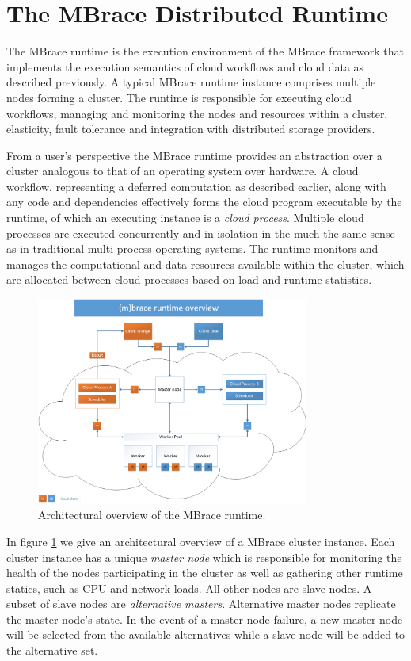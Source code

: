 \documentclass[9pt,a4paper]{article}
\newcommand{\mbrace}{MBrace}
\newcommand{\TitularMbrace}{MBrace}
\begin{document}
\section{The \TitularMbrace{} Distributed Runtime}
\label{sec:runtime}

The \mbrace{} runtime is the execution environment of the \mbrace{} framework
that implements the execution semantics of cloud workflows and cloud data
as described previously. A typical \mbrace{} runtime instance comprises
multiple nodes forming a cluster. The runtime is responsible for executing cloud
workflows, managing and monitoring the nodes and resources within a cluster,
elasticity, fault tolerance and integration with distributed storage providers.

From a user's perspective the \mbrace{} runtime provides an abstraction over a
cluster analogous to that of an operating system over hardware. A cloud
workflow, representing a deferred computation as described earlier, along with
any code and dependencies effectively forms the cloud program executable by the
runtime, of which an executing instance is a \emph{cloud process}. Multiple
cloud processes are executed concurrently and in isolation in the much the same
sense as in traditional multi-process operating systems. The runtime monitors
and manages the computational and data resources available within the cluster,
which are allocated between cloud processes based on load and runtime
statistics.
%
\begin{figure}[ht]
\label{runtime-figure}
\centering
\includegraphics[width=0.8\textwidth]{runtime.png}
\caption{Architectural overview of the \mbrace{} runtime.}
\end{figure}

In figure \ref{runtime-figure} we give an architectural overview of a \mbrace{}
cluster instance. Each cluster instance has a unique \emph{master node} which is
responsible for monitoring the health of the nodes participating in the cluster
as well as gathering other runtime statics, such as CPU and network loads. All
other nodes are slave nodes. A subset of slave nodes are \emph{alternative
  masters}. Alternative master nodes replicate the master node's state. In the
event of a master node failure, a new master node will be selected from the
available alternatives while a slave node will be added to the alternative set.
\end{document}

